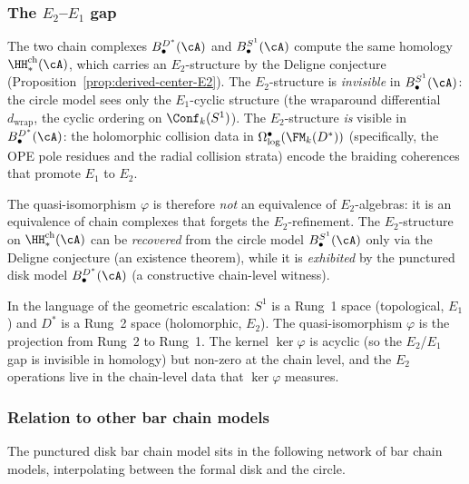 \subsubsection{\texorpdfstring{The $E_2$--$E_1$ gap}{The E2--E1 gap}}

\begin{remark}%
\label{rem:E2-E1-chain-gap}%
%
%
The two chain complexes $B^{D^*}_\bullet(\cA)$
and $B^{S^1}_\bullet(\cA)$ compute the same
homology $\HH^{\mathrm{ch}}_*(\cA)$, which carries
an $E_2$-structure by the Deligne conjecture
\textup{(}Proposition~\textup{\ref{prop:derived-center-E2}}\textup{)}.
The $E_2$-structure is \emph{invisible} in
$B^{S^1}_\bullet(\cA)$: the circle model sees
only the $E_1$-cyclic structure (the wraparound
differential $d_{\mathrm{wrap}}$, the cyclic
ordering on $\Conf_k(S^1)$). The $E_2$-structure
\emph{is} visible in $B^{D^*}_\bullet(\cA)$: the
holomorphic collision data in
$\Omega^\bullet_{\log}(\FM_k(D^*))$ (specifically,
the OPE pole residues and the radial collision
strata) encode the braiding coherences that promote
$E_1$ to $E_2$.

The quasi-isomorphism $\varphi$ is therefore
\emph{not} an equivalence of $E_2$-algebras: it is
an equivalence of chain complexes that forgets the
$E_2$-refinement. The $E_2$-structure on
$\HH^{\mathrm{ch}}_*(\cA)$ can be
\emph{recovered} from the circle model $B^{S^1}_\bullet(\cA)$
only via the Deligne conjecture (an existence theorem),
while it is \emph{exhibited} by the punctured disk
model $B^{D^*}_\bullet(\cA)$ (a constructive chain-level
witness).

In the language of the geometric escalation:
$S^1$ is a Rung~1 space (topological, $E_1$)
and $D^*$ is a Rung~2 space (holomorphic, $E_2$).
The quasi-isomorphism $\varphi$ is the projection
from Rung~2 to Rung~1. The kernel $\ker\varphi$ is
acyclic (so the $E_2$/$E_1$ gap is invisible in
homology) but non-zero at the chain level, and the
$E_2$ operations live in the chain-level data that
$\ker\varphi$ measures.
\end{remark}

\subsubsection{Relation to other bar chain models}

The punctured disk bar chain model sits in the
following network of bar chain models, interpolating
between the formal disk and the circle.

